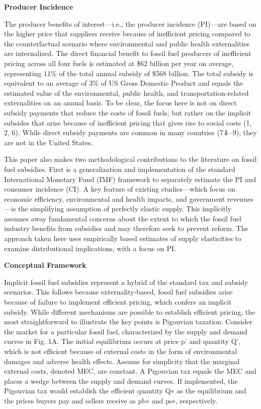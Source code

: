 \documentclass[
]{book}
\begin{document}
\textbf{Producer Incidence}

The producer benefits of interest---i.e., the producer incidence (PI)---are based on the higher price that suppliers receive because of inefficient pricing compared to the counterfactual scenario where environmental and public health externalities are internalized. The direct financial benefit to fossil fuel producers of inefficient pricing across all four fuels is estimated at \$62 billion per year on average,
representing 11\% of the total annual subsidy of \$568 billion. The total subsidy is equivalent to an average of 3\% of US Gross Domestic Product and equals the estimated value of the environmental, public health, and transportation-related externalities on an annual basis. To be clear, the focus here is not on direct subsidy payments that reduce the costs of fossil fuels, but rather on the implicit subsides that arise because of inefficient pricing that gives rise to social costs (1, 2, 6). While direct subsidy payments are common in many countries (7⇓--9), they are not in the United States.

This paper also makes two methodological contributions to the literature on fossil fuel subsidies. First is a generalization and implementation of the standard International Monetary Fund (IMF) framework to separately estimate the PI and consumer incidence (CI). A key feature of existing studies---which focus on economic efficiency, environmental and health impacts, and government revenues---is the simplifying assumption of perfectly elastic supply. This implicitly assumes away fundamental concerns about the extent to which the fossil fuel industry benefits from subsidies and may therefore seek to prevent reform. The approach taken here uses empirically based estimates of supply elasticities to examine distributional implications, with a focus on PI.

\textbf{Conceptual Framework}

Implicit fossil fuel subsidies represent a hybrid of the standard tax and subsidy scenarios. This follows because externality-based, fossil fuel subsidies arise because of failure to implement efficient pricing, which confers an implicit subsidy. While different mechanisms are possible to establish efficient pricing, the most straightforward to illustrate the key points is Pigouvian taxation. Consider the market for a particular fossil fuel, characterized by the supply and demand curves in Fig. 1A. The initial equilibrium occurs at price p' and quantity Q', which is not efficient because of external costs in the form of environmental damages and adverse health effects. Assume for simplicity that the marginal external costs, denoted MEC, are constant. A Pigouvian tax equals the MEC and places a wedge between the supply and demand curves. If implemented, the Pigouvian tax would establish the efficient quantity Q∗ as the equilibrium and the prices buyers pay and sellers receive as pb∗ and ps∗, respectively.
\end{document}
